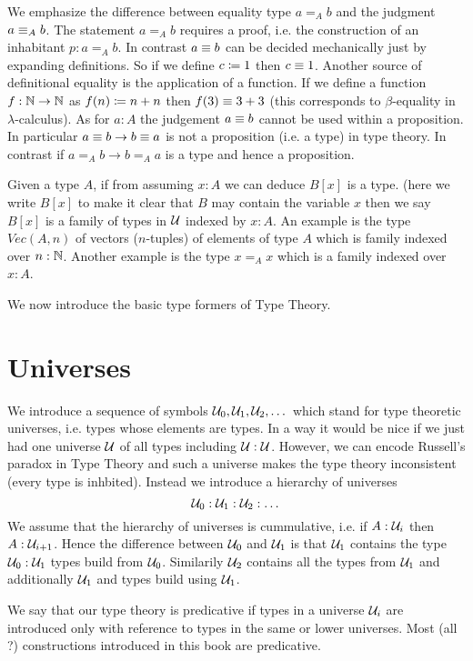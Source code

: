 We emphasize the difference between equality type $a =_A
b$ and the judgment $a \equiv_A b$. The statement $a =_A b$ requires a
proof, i.e. the construction of an inhabitant $p : a =_A b$. In
contrast $a \equiv b$ can be decided mechanically just by expanding
definitions. So if we define $c \coloneqq 1$ then $c\equiv 1$. Another
source of definitional equality is the application of a function. If
we define a function $f : \mathbb{N} \to \mathbb{N}$ as $f(n) \coloneqq n + n$ then
$f(3) \equiv 3+3$ (this corresponds to $\beta$-equality in
$\lambda$-calculus). As for $a : A$ the judgement $a \equiv b$
cannot be used within a proposition. In particular  $a
\equiv b \to b \equiv a$ is not a proposition (i.e. a type) in type theory. In
contrast if $a =_A b \to b =_A a$ is a type and hence a proposition.

Given a type $A$, if from assuming $x:A$ we can deduce $B[x]$ is a type.
(here we write $B[x]$ to make it clear that $B$ may contain the
variable $x$ then we say $B[x]$ is a
family of types in ${\mathcal U}$ indexed by $x:A$. An example is the type $Vec(A,n)$ of
vectors ($n$-tuples) of elements of type $A$ which is family indexed
over $n : \mathbb{N}$. Another example is the type $x =_A x$ which is a
family indexed over $x : A$.

We now introduce the basic type formers of Type Theory.

\section{Universes}
\label{sec:universes}

We introduce a sequence of symbols ${\mathcal U}_0,{\mathcal U}_1,{\mathcal U}_2, \dots$ which
stand for type theoretic universes, i.e. types whose elements are
types. In a way it would be nice if we just had one universe ${\mathcal U}$ of
all types including ${\mathcal U} : {\mathcal U}$. However, we can encode Russell's
paradox in Type Theory and such a universe makes the type theory
inconsistent (every type is inhbited). Instead we introduce a
hierarchy of universes
\[ {\mathcal U}_0 : {\mathcal U}_1 : {\mathcal U}_2 : \dots \]
We assume that the hierarchy of universes is cummulative, i.e. if
$A:{\mathcal U}_i$ then $A : {\mathcal U}_{i+1}$. Hence the difference between
${\mathcal U}_0$ and ${\mathcal U}_1$ is that ${\mathcal U}_1$ contains the type ${\mathcal U}_0:{\mathcal U}_1$
types build from ${\mathcal U}_0$. Similarily ${\mathcal U}_2$ contains all the types
from ${\mathcal U}_1$ and additionally ${\mathcal U}_1$ and types build using ${\mathcal U}_1$. 

We say that our type theory is predicative if types in a universe
${\mathcal U}_i$ are introduced only with reference to types in the same or
lower universes. Most (all ?) constructions introduced in this book
are predicative. 

